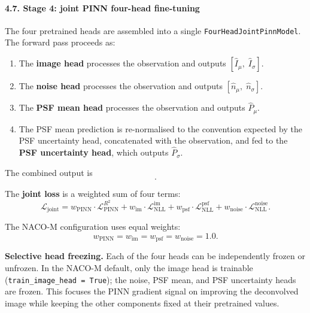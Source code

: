 \documentclass{aa}
\begin{document}
\paragraph{4.7. Stage 4: joint PINN four-head fine-tuning}

The four pretrained heads are assembled into a single \texttt{FourHeadJointPinnModel}. The forward pass proceeds as:
\begin{enumerate}
    \item The \textbf{image head} processes the observation and outputs $[\hat{I}_\mu,\; \hat{I}_\sigma]$.
    \item The \textbf{noise head} processes the observation and outputs $[\hat{n}_\mu,\; \hat{n}_\sigma]$.
    \item The \textbf{PSF mean head} processes the observation and outputs $\hat{P}_\mu$.
    \item The PSF mean prediction is re-normalised to the convention expected by the PSF uncertainty head, concatenated with the observation, and fed to the \textbf{PSF uncertainty head}, which outputs $\hat{P}_\sigma$.
\end{enumerate}

The combined output is
\begin{equation}
[\hat{I}_\mu, \hat{P}_\mu, \hat{n}_\mu, \hat{I}_\sigma, \hat{P}_\sigma, \hat{n}_\sigma].
\end{equation}

The \textbf{joint loss} is a weighted sum of four terms:
\begin{equation}
\mathcal{L}_{\mathrm{joint}}
=
w_{\mathrm{PINN}} \cdot \mathcal{L}_{\mathrm{PINN}}^{R^2}
+ w_{\mathrm{im}} \cdot \mathcal{L}_{\mathrm{NLL}}^{\mathrm{im}}
+ w_{\mathrm{psf}} \cdot \mathcal{L}_{\mathrm{NLL}}^{\mathrm{psf}}
+ w_{\mathrm{noise}} \cdot \mathcal{L}_{\mathrm{NLL}}^{\mathrm{noise}}.
\end{equation}

The NACO-M configuration uses equal weights:
\begin{equation}
w_{\mathrm{PINN}} = w_{\mathrm{im}} = w_{\mathrm{psf}} = w_{\mathrm{noise}} = 1.0.
\end{equation}

\textbf{Selective head freezing.} Each of the four heads can be independently frozen or unfrozen. In the NACO-M default, only the image head is trainable (\texttt{train\_image\_head = True}); the noise, PSF mean, and PSF uncertainty heads are frozen. This focuses the PINN gradient signal on improving the deconvolved image while keeping the other components fixed at their pretrained values.
\end{document}
